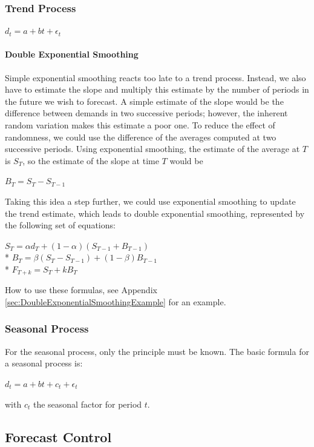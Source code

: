 \documentclass[12pt]{article}
\begin{document}
\subsubsection{Trend Process}
\begin{center}
$d_t = a + bt + \epsilon_t$
\end{center}
\paragraph{Double Exponential Smoothing} Simple exponential smoothing reacts too late to a trend process. Instead, we also have to estimate the slope and multiply this estimate by the number of periods in the future we wish to forecast. A simple estimate of the slope would be the difference between demands in two successive periods; however, the inherent random variation makes this estimate a poor one. To reduce the effect of randomness, we could use the difference of the averages computed at two successive periods. Using exponential smoothing, the estimate of the average at $T$ is $S_T$, so the estimate of the slope at time $T$ would be
\begin{center}
$B_T = S_T - S_{T-1}$
\end{center}
Taking this idea a step further, we could use exponential smoothing to update the trend estimate, which leads to double exponential smoothing, represented by the following set of equations:
\begin{center}
$S_T = \alpha d_T + (1 - \alpha)(S_{T-1} + B_{T-1})$\\*
$B_T = \beta(S_T - S_{T-1}) + (1 - \beta)B_{T-1}$\\*
$F_{T+k} = S_T + kB_T$
\end{center}
How to use these formulas, see Appendix \ref{sec:DoubleExponentialSmoothingExample} for an example.
\subsubsection{Seasonal Process}
For the seasonal process, only the principle must be known. The basic formula for a seasonal process is:
\begin{center}
$d_t = a + bt + c_t + \epsilon_t$
\end{center}
with $c_t$ the seasonal factor for period $t$.
\setcounter{subsection}{6}
\subsection{Forecast Control}
\end{document}
